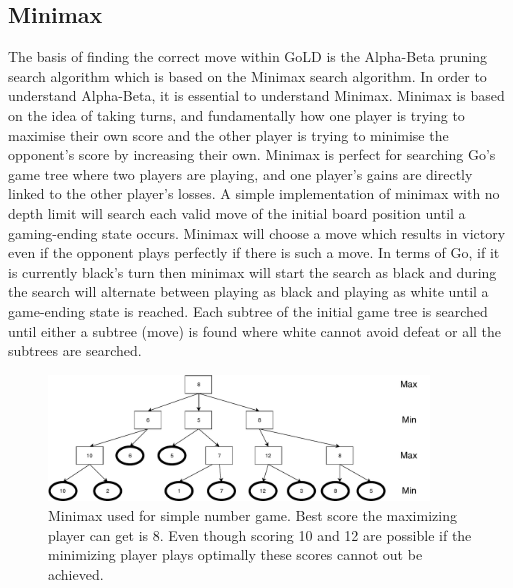 \documentclass{l4proj}
\begin{document}
\subsection{Minimax}
The basis of finding the correct move within GoLD is the Alpha-Beta pruning search algorithm which is based on the Minimax search algorithm. In order to understand Alpha-Beta, it is essential to understand Minimax. Minimax is based on the idea of taking turns, and fundamentally how one player is trying to maximise their own score and the other player is trying to minimise the opponent's score by increasing their own. Minimax is perfect for searching Go’s game tree where two players are playing, and one player’s gains are directly linked to the other player’s losses. A simple implementation of minimax with no depth limit will search each valid move of the initial board position until a gaming-ending state occurs. Minimax will choose a move which results in victory even if the opponent plays perfectly if there is such a move. In terms of Go, if it is currently black’s turn then minimax will start the search as black and during the search will alternate between playing as black and playing as white until a game-ending state is reached. Each subtree of the initial game tree is searched until either a subtree (move) is found where white cannot avoid defeat or all the subtrees are searched.
\begin{figure}[!ht]
\centering
\includegraphics[width=0.9\textwidth]{MinMaxNumTree}
\caption{Minimax used for simple number game. Best score the maximizing player can get is 8. Even though scoring 10 and 12 are possible if the minimizing player plays optimally these scores cannot out be achieved.}
\label{fig:MinMaxNumTree}
\end{figure}
\end{document}
